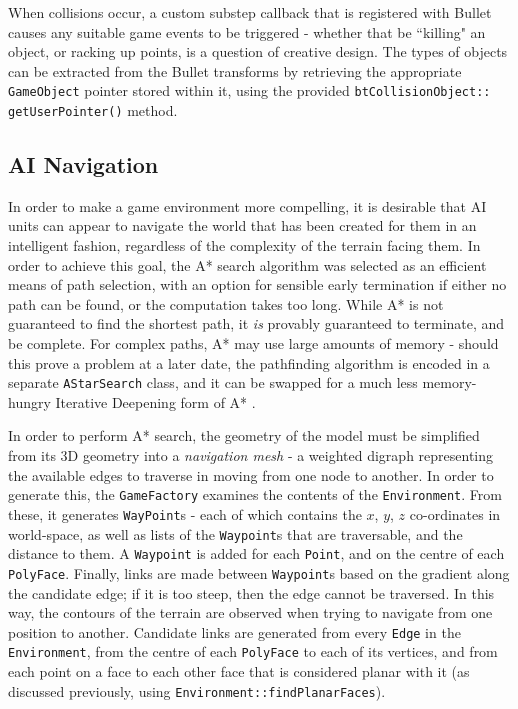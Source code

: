 \documentclass[a4paper,10pt]{article}
\begin{document}
When collisions occur, a custom substep callback that is registered with Bullet causes any suitable game events to be triggered - whether that be ``killing" an object, or racking up points, is a question of creative design. The types of objects can be extracted from the Bullet transforms by retrieving the appropriate \texttt{GameObject} pointer stored within it, using the provided \texttt{btCollisionObject:: getUserPointer()} method.

\subsection{AI Navigation}
In order to make a game environment more compelling, it is desirable that AI units can appear to navigate the world that has been created for them in an intelligent fashion, regardless of the complexity of the terrain facing them. In order to achieve this goal, the A* search algorithm \cite{astar} was selected as an efficient means of path selection, with an option for sensible early termination if either no path can be found, or the computation takes too long. While A* is not guaranteed to find the shortest path, it \textit{is} provably guaranteed to terminate, and be complete. For complex paths, A* may use large amounts of memory - should this prove a problem at a later date, the pathfinding algorithm is encoded in a separate \texttt{AStarSearch} class, and it can be swapped for a much less memory-hungry Iterative Deepening form of A* \cite{idastar}.

In order to perform A* search, the geometry of the model must be simplified from its 3D geometry into a \textit{navigation mesh} - a weighted digraph representing the available edges to traverse in moving from one node to another. In order to generate this, the \texttt{GameFactory} examines the contents of the \texttt{Environment}. From these, it generates \texttt{WayPoint}s - each of which contains the $x$, $y$, $z$ co-ordinates in world-space, as well as lists of the \texttt{Waypoint}s that are traversable, and the distance to them. A \texttt{Waypoint} is added for each \texttt{Point}, and on the centre of each \texttt{PolyFace}. Finally, links are made between \texttt{Waypoint}s based on the gradient along the candidate edge; if it is too steep, then the edge cannot be traversed. In this way, the contours of the terrain are observed when trying to navigate from one position to another. Candidate links are generated from every \texttt{Edge} in the \texttt{Environment}, from the centre of each \texttt{PolyFace} to each of its vertices, and from each point on a face to each other face that is considered planar with it (as discussed previously, using \texttt{Environment::findPlanarFaces}).
\end{document}
